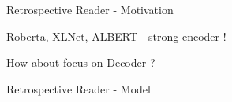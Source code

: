 \documentclass[10pt]{beamer}
\begin{document}
\begin{frame}{Retrospective Reader - Motivation}
    
    Roberta, XLNet, ALBERT  - strong encoder !

    How about focus on Decoder ?
    \begin{figure}
        \begin{center}
        \end{center}
    \end{figure}

\end{frame}

\begin{frame}{Retrospective Reader - Model}

    \begin{figure}
        \begin{center}
        \end{center}
    \end{figure}

\end{frame}
\end{document}
